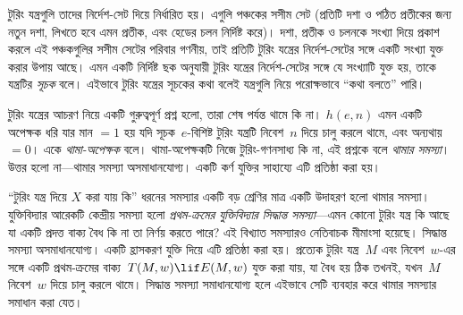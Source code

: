 টুরিং যন্ত্রগুলি তাদের নির্দেশ-সেট দিয়ে নির্ধারিত হয়। এগুলি
পঞ্চকের সসীম সেট (প্রতিটি দশা ও পঠিত প্রতীকের জন্য নতুন দশা,
লিখতে হবে এমন প্রতীক, এবং হেডের চলন নির্দিষ্ট করে)। দশা, প্রতীক ও
চলনকে সংখ্যা দিয়ে প্রকাশ করলে এই পঞ্চকগুলির সসীম সেটের পরিবার
গণনীয়, তাই প্রতিটি টুরিং যন্ত্রের
নির্দেশ-সেটের সঙ্গে একটি সংখ্যা যুক্ত করার উপায় আছে। এমন একটি
নির্দিষ্ট ছক অনুযায়ী টুরিং যন্ত্রের নির্দেশ-সেটের সঙ্গে যে সংখ্যাটি
যুক্ত হয়, তাকে যন্ত্রটির \emph{সূচক} বলে। এইভাবে টুরিং যন্ত্রের
সূচকের কথা বলেই যন্ত্রগুলি নিয়ে পরোক্ষভাবে ``কথা বলতে'' পারি।

টুরিং যন্ত্রের আচরণ নিয়ে একটি গুরুত্বপূর্ণ প্রশ্ন হলো, তারা
শেষ পর্যন্ত থামে কি না। $h(e, n)$ এমন একটি অপেক্ষক ধরি যার মান
$= 1$ হয় যদি সূচক~$e$-বিশিষ্ট টুরিং যন্ত্রটি নিবেশ~$n$ দিয়ে
চালু করলে থামে, এবং অন্যথায় $=0$। একে \emph{থামা-অপেক্ষক} বলে।
থামা-অপেক্ষকটি নিজে টুরিং-গণনসাধ্য কি না, এই প্রশ্নকে বলে
\emph{থামার সমস্যা}। উত্তর হলো না—থামার সমস্যা অসমাধানযোগ্য।
একটি কর্ণ যুক্তির সাহায্যে এটি প্রতিষ্ঠা করা হয়।

``টুরিং যন্ত্র দিয়ে $X$ করা যায় কি'' ধরনের সমস্যার একটি বড়
শ্রেণির মাত্র একটি উদাহরণ হলো থামার সমস্যা। যুক্তিবিদ্যার আরেকটি
কেন্দ্রীয় সমস্যা হলো \emph{প্রথম-ক্রমের যুক্তিবিদ্যার সিদ্ধান্ত
সমস্যা}—এমন কোনো টুরিং যন্ত্র কি আছে যা একটি প্রদত্ত বাক্য বৈধ কি
না তা নির্ণয় করতে পারে? এই বিখ্যাত সমস্যারও নেতিবাচক মীমাংসা
হয়েছে। সিদ্ধান্ত সমস্যা অসমাধানযোগ্য। একটি হ্রাসকরণ যুক্তি দিয়ে
এটি প্রতিষ্ঠা করা হয়। প্রত্যেক টুরিং যন্ত্র~$M$ এবং নিবেশ~$w$-এর
সঙ্গে একটি প্রথম-ক্রমের বাক্য~$T(M, w) \lif E(M, w)$ যুক্ত করা যায়,
যা বৈধ হয় ঠিক তখনই, যখন~$M$ নিবেশ~$w$ দিয়ে চালু করলে থামে।
সিদ্ধান্ত সমস্যা সমাধানযোগ্য হলে এইভাবে সেটি ব্যবহার করে থামার
সমস্যার সমাধান করা যেত।
